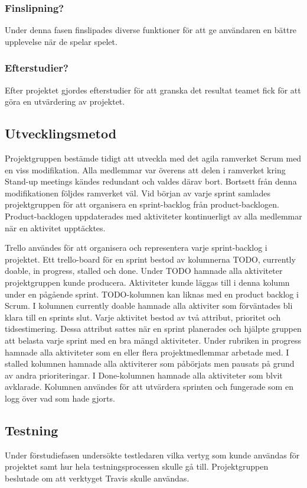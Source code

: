 {
  \color{red}

\subsubsection*{Finslipning?}
Under denna fasen finslipades diverse funktioner för att ge användaren en bättre upplevelse när de spelar spelet.

\subsubsection*{Efterstudier?}
Efter projektet gjordes efterstudier för att granska det resultat teamet fick för att göra en utvärdering av projektet.
}
\subsection{Utvecklingsmetod}
Projektgruppen bestämde tidigt att utveckla med det agila ramverket Scrum med en viss modifikation. Alla medlemmar var överens att delen i ramverket kring Stand-up meetings kändes redundant och valdes därav bort. Bortsett från denna modifikationen följdes ramverket väl. Vid början av varje sprint samlades projektgruppen för att organisera en sprint-backlog från product-backlogen. Product-backlogen uppdaterades med aktiviteter kontinuerligt av alla medlemmar när en aktivitet upptäcktes.

Trello användes för att organisera och representera varje sprint-backlog i projektet. Ett trello-board för en sprint bestod av kolumnerna TODO, currently doable, in progress, stalled och done. Under TODO hamnade alla aktiviteter projektgruppen kunde producera. Aktiviteter kunde läggas till i denna kolumn under en pågående sprint. TODO-kolumnen kan liknas med en product backlog i Scrum. I kolumnen currently doable hamnade alla aktiviter som förväntades bli klara till en sprints slut. Varje aktivitet bestod av två attribut, prioritet och tidsestimering. Dessa attribut sattes när en sprint planerades och hjälpte gruppen att belasta varje sprint med en bra mängd aktiviteter. Under rubriken in progress hamnade alla aktiviteter som en eller flera projektmedlemmar arbetade med. I stalled kolumnen hamnade alla aktiviterer som påbörjats men pausats på grund av andra prioriteringar. I Done-kolumnen hamnade alla aktiviteter som blvit avklarade. Kolumnen användes för att utvärdera sprinten och fungerade som en logg över vad som hade gjorts.

\subsection{Testning}
Under förstudiefasen undersökte testledaren vilka vertyg som kunde användas för projektet samt hur hela testningsprocessen skulle gå till. Projektgruppen beslutade om att verktyget Travis skulle användas.


